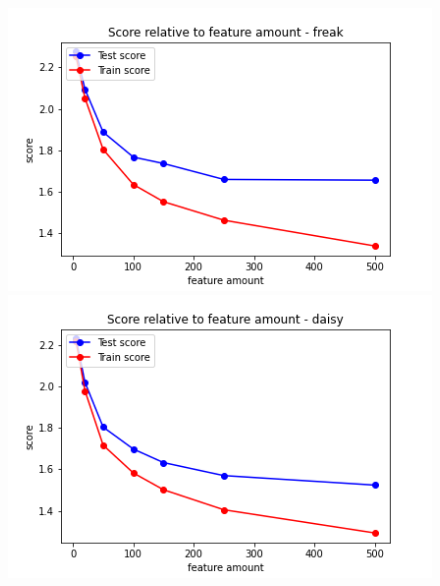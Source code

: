 \begin{figure}[H]
  \centering
  \begin{minipage}[b]{0.4\textwidth}
    \includegraphics[width=\textwidth]{images/2-LBM-feature_amount_freak_small_values.png}
  \end{minipage}
  \hfill
  \begin{minipage}[b]{0.4\textwidth}
    \includegraphics[width=\textwidth]{images/2-LBM-feature_amount_daisy_small_values.png}
  \end{minipage}
\end{figure}

